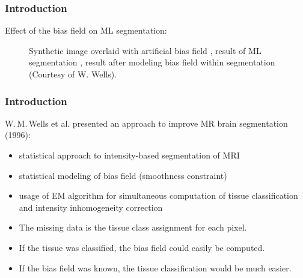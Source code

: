 \begin{frame}
  \frametitle{Introduction \cont}
  
  Effect of the bias field on ML segmentation:

  \begin{figure}
    \centering
    \caption{Synthetic image  overlaid with artificial bias field , result of ML segmentation , result after modeling bias field within segmentation  (Courtesy of W. Wells).}
  \end{figure}
\end{frame}


\begin{frame}
  \frametitle{Introduction \cont}

  W.\,M.\,Wells et al. presented an approach to improve MR brain segmentation (1996):

  \begin{itemize}
    \item statistical approach to intensity-based segmentation of MRI
    \item statistical modeling of bias field (smoothness constraint)
    \item usage of EM algorithm for simultaneous computation of tissue classification and intensity inhomogeneity correction
  \end{itemize}
  \pspread


  \begin{itemize}
    \item The missing data is the tissue class assignment for each pixel. \pause 
    \item If the tissue was classified, the bias field could easily be computed. \pause
    \item If the bias field was known, the tissue classification would be much easier. 
  \end{itemize}
\end{frame}


